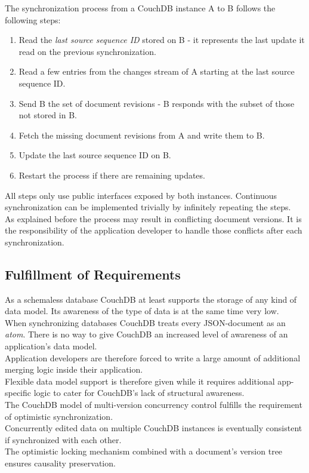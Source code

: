 The synchronization process from a CouchDB instance A to B follows the following steps:

\begin{enumerate}
\item Read the \emph{last source sequence ID} stored on B - it represents the last update it read on the previous synchronization.
\item Read a few entries from the changes stream of A starting at the last source sequence ID.
\item Send B the set of document revisions - B responds with the subset of those not stored in B.
\item Fetch the missing document revisions from A and write them to B.
\item Update the last source sequence ID on B.
\item Restart the process if there are remaining updates.
\end{enumerate}

All steps only use public interfaces exposed by both instances.
Continuous synchronization can be implemented trivially by infinitely repeating the steps.\\
As explained before the process may result in conflicting document versions.
It is the responsibility of the application developer to handle those conflicts after each synchronization.

\subsection{Fulfillment of Requirements}
As a schemaless database CouchDB at least supports the storage of any kind of data model.
Its awareness of the type of data is at the same time very low.\\
When synchronizing databases CouchDB treats every JSON-document as an \emph{atom}.
There is no way to give CouchDB an increased level of awareness of an application's data model.\\
Application developers are therefore forced to write a large amount of additional merging logic inside their application.\\
Flexible data model support is therefore given while it requires additional app-specific logic to cater for CouchDB's lack of structural awareness.\\

The CouchDB model of multi-version concurrency control fulfills the requirement of optimistic synchronization.\\
Concurrently edited data on multiple CouchDB instances is eventually consistent if synchronized with each other.\\
The optimistic locking mechanism combined with a document's version tree ensures causality preservation.


